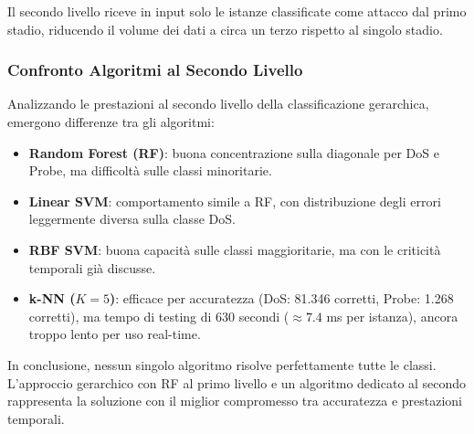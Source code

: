 Il secondo livello riceve in input solo le istanze
classificate come attacco dal primo stadio, riducendo
il volume dei dati a circa un terzo rispetto al
singolo stadio.

\subsubsection{Confronto Algoritmi al Secondo Livello}

Analizzando le prestazioni al secondo livello della
classificazione gerarchica, emergono differenze tra
gli algoritmi:

\begin{itemize}
    \item \textbf{Random Forest (RF)}: buona
        concentrazione sulla diagonale per DoS e Probe,
        ma difficoltà sulle classi minoritarie.
    \item \textbf{Linear SVM}: comportamento simile
        a RF, con distribuzione degli errori leggermente
        diversa sulla classe DoS.
    \item \textbf{RBF SVM}: buona capacità sulle classi
        maggioritarie, ma con le criticità temporali
        già discusse.
    \item \textbf{k-NN ($K=5$)}: efficace per accuratezza
        (DoS: 81.346 corretti, Probe: 1.268 corretti),
        ma tempo di testing di 630 secondi
        ($\approx 7.4$ ms per istanza), ancora troppo
        lento per uso real-time.
\end{itemize}

In conclusione, nessun singolo algoritmo risolve
perfettamente tutte le classi. L'approccio gerarchico
con RF al primo livello e un algoritmo dedicato al
secondo rappresenta la soluzione con il miglior
compromesso tra accuratezza e prestazioni temporali.
